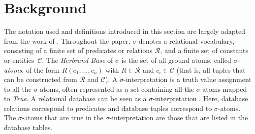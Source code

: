 \documentclass[akbc,twoside,11pt]{article}
\begin{document}
\section{Background}
\label{sec:back}
The notation used and definitions introduced in this section are largely adapted from the work of \citet{DBLP:conf/kr/CeylanDB16}. Throughout the paper, $\sigma$ denotes a relational vocabulary, consisting of a finite set of predicates or relations $\mathcal{R}$, and a finite set of constants or entities~$\mathcal{C}$. The \textit{Herbrand Base} of $\sigma$ is the set of all ground atoms, called $\sigma$\textit{-atoms}, of the form $R(c_1, ..., c_n)$ with $R \in {\mathcal R}$ and $c_i \in \mathcal{C}$ (that is, all tuples that can be constructed from $\mathcal{R}$ and $\mathcal{C}$). A $\sigma$-interpretation is a truth value assignment to all the $\sigma$-atoms, often represented as a set containing all the $\sigma$-atoms mapped to \textit{True}. A relational database can be seen as a $\sigma$-interpretation \cite{abiteboul1995foundations}. Here, database relations correspond to predicates and database tuples correspond to $\sigma$-atoms. The $\sigma$-atoms that are true in the $\sigma$-interpretation are those that are listed in the database tables.
\end{document}

